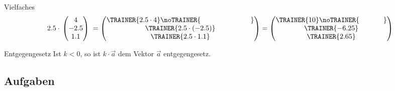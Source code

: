 \begin{beispiel}{Vielfaches}{}
  $$2.5\cdot{} \begin{pmatrix} 4 \\ -2.5 \\ 1.1 \end{pmatrix} \;
  = \begin{pmatrix}\TRAINER{2.5\cdot{} 4}\noTRAINER{\hspace{25mm}}  \\ \TRAINER{2.5\cdot{} (-2.5)} \\ \TRAINER{2.5\cdot{} 1.1} \end{pmatrix}
  = \begin{pmatrix}\TRAINER{10}\noTRAINER{\hspace{12mm}} \\ \TRAINER{-6.25} \\ \TRAINER{2.65} \end{pmatrix}$$
\end{beispiel}

\begin{bemerkung}{Entgegengesetz}{}
  Ist $k<0$, so ist $k\cdot{}\vec{a}$ dem Vektor $\vec{a}$ entgegengesetz.
\end{bemerkung}


\subsection*{Aufgaben}
